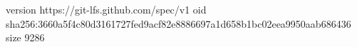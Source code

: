version https://git-lfs.github.com/spec/v1
oid sha256:3660a5f4c80d3161727fed9acf82e8886697a1d658b1bc02eea9950aab686436
size 9286
